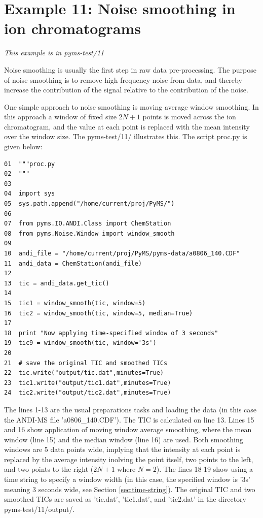 \section{Example 11: Noise smoothing in ion chromatograms}

\noindent
{\em This example is in pyms-test/11}

Noise smoothing is usually the first step in raw data pre-processing. The
purpose of noise smoothing is to remove high-frequency noise from data, and
thereby increase the contribution of the signal relative to the contribution
of the noise.

One simple approach to noise smoothing is moving average window smoothing.
In this approach a window of fixed size $2N+1$ points is moved across the ion
chromatogram, and the value at each point is replaced with the mean intensity
over the window size. The pyms-test/11/ illustrates this. The script proc.py
is given below:

\begin{verbatim}
01  """proc.py
02  """
03  
04  import sys
05  sys.path.append("/home/current/proj/PyMS/")
06  
07  from pyms.IO.ANDI.Class import ChemStation
08  from pyms.Noise.Window import window_smooth
09  
10  andi_file = "/home/current/proj/PyMS/pyms-data/a0806_140.CDF"
11  andi_data = ChemStation(andi_file)
12  
13  tic = andi_data.get_tic()
14  
15  tic1 = window_smooth(tic, window=5)
16  tic2 = window_smooth(tic, window=5, median=True)
17  
18  print "Now applying time-specified window of 3 seconds"
19  tic9 = window_smooth(tic, window='3s')
20  
21  # save the original TIC and smoothed TICs
22  tic.write("output/tic.dat",minutes=True)
23  tic1.write("output/tic1.dat",minutes=True)
24  tic2.write("output/tic2.dat",minutes=True)
\end{verbatim}

\noindent
The lines 1-13 are the usual preparations tasks and loading the data (in this
case the ANDI-MS file 'a0806\_140.CDF'). The TIC is calculated on line 13.
Lines 15 and 16 show application of moving window average smoothing, where
the mean window (line 15) and the median window (line 16) are used. Both
smoothing windows are 5 data points wide, implying that the intensity at
each point is replaced by the average intensity inolving the point itself,
two points to the left, and two points to the right ($2N+1$ where $N=2$).
The lines 18-19 show using a time string to specify a window width (in
this case, the specified window is '3s' meaning 3 seconds wide, see
Section \ref{sec:time-string}).  The original TIC and two smoothed TICs are
saved as 'tic.dat', 'tic1.dat', and 'tic2.dat' in the directory
pyms-test/11/output/.

